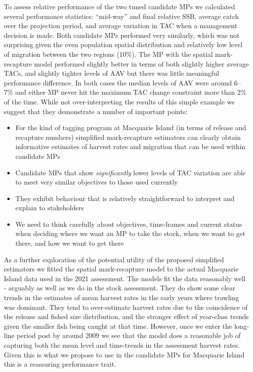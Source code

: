 \documentclass[12pt,a4paper,twoside,times,sky,standard]{csiroreport2017}
\begin{document}
To assess relative performance of the two tuned candidate MPs we calculated several performance statistics: ``mid-way'' and final relative SSB, average catch over the projection period, and average variation in TAC when a management decision is made. Both candidate MPs performed very similarly, which was not surprising given the even population spatial distribution and relatively low level of migration between the two regions (10\%). The MP with the spatial mark-recapture model performed slightly better in terms of both slightly higher average TACs, and slightly tighter levels of AAV but there was little meaningful performance difference. In both cases the median levels of AAV were around 6--7\% and either MP never hit the maximum TAC change constraint more than 2\% of the time. While not over-interpreting the results of this simple example we suggest that they demonstrate a number of important points:

\begin{itemize}
    \item For the kind of tagging program at Macquarie Island (in terms of release and recapture numbers) simplified mark-recapture estimators can clearly obtain informative estimates of harvest rates and migration that can be used within candidate MPs
    \item Candidate MPs that show \emph{significantly} lower levels of TAC variation are able to meet very similar objectives to those used currently
    \item They exhibit behaviour that is relatively straightforward to interpret and explain to stakeholders
    \item We need to think carefully about objectives, time-frames and current status when deciding where we want an MP to take the stock, when we want to get there, and how we want to get there
\end{itemize}

As a further exploration of the potential utility of the proposed simplified estimators we fitted the spatial mark-recapture model to the actual Macquarie Island data used in the 2021 assessment. The models fit the data reasonably well - arguably as well as we do in the stock assessment. They do show some clear trends in the estimates of mean harvest rates in the early years where trawling was dominant. They tend to over-estimate harvest rates due to the coincidence of the release and fished size distribution, and the stronger effect of year-class trends given the smaller fish being caught at that time. However, once we enter the long-line period post by around 2009 we see that the model does a reasonable job of capturing both the mean level and time-trends in the assessment harvest rates. Given this is what we propose to use in the candidate MPs for Macquarie Island this is a reassuring performance trait.  
\end{document}
